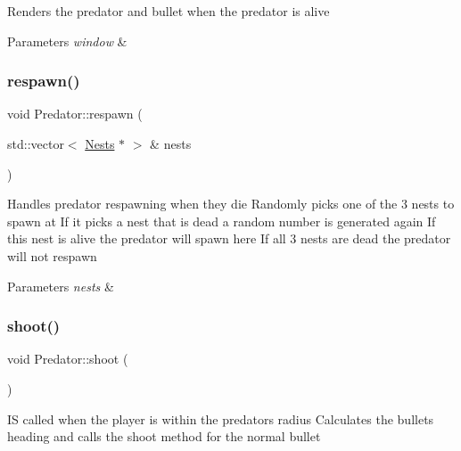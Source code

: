 Renders the predator and bullet when the predator is alive 


\begin{DoxyParams}{Parameters}
{\em window} & \\
\hline
\end{DoxyParams}
\mbox{\label{class_predator_acf5250b053f3680563a40d8b7ae3c383}} 
\subsubsection{\texorpdfstring{respawn()}{respawn()}}
{\footnotesize\ttfamily void Predator\+::respawn (\begin{DoxyParamCaption}\item[{std\+::vector$<$ \mbox{\hyperlink{class_nests}{Nests}} $\ast$ $>$ \&}]{nests }\end{DoxyParamCaption})}



Handles predator respawning when they die Randomly picks one of the 3 nests to spawn at If it picks a nest that is dead a random number is generated again If this nest is alive the predator will spawn here If all 3 nests are dead the predator will not respawn 


\begin{DoxyParams}{Parameters}
{\em nests} & \\
\hline
\end{DoxyParams}
\mbox{\label{class_predator_ac078fe0abadc023f09ee100b7623be49}} 
\subsubsection{\texorpdfstring{shoot()}{shoot()}}
{\footnotesize\ttfamily void Predator\+::shoot (\begin{DoxyParamCaption}{ }\end{DoxyParamCaption})}



IS called when the player is within the predators radius Calculates the bullets heading and calls the shoot method for the normal bullet 

\mbox{\label{class_predator_a56dd513f17d7a3e4f3504d44b3deb3c0}} 
